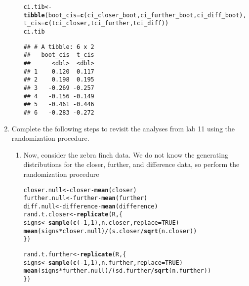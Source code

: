 \documentclass{article}\usepackage[]{graphicx}\usepackage[]{xcolor}
\makeatletter
\newcommand{\hlnum}[1]{\textcolor[rgb]{0.686,0.059,0.569}{#1}}%
\newcommand{\hlopt}[1]{\textcolor[rgb]{0,0,0}{#1}}%
\newcommand{\hldef}[1]{\textcolor[rgb]{0.345,0.345,0.345}{#1}}%
\newcommand{\hlkwb}[1]{\textcolor[rgb]{0.69,0.353,0.396}{#1}}%
\newcommand{\hlkwc}[1]{\textcolor[rgb]{0.333,0.667,0.333}{#1}}%
\newcommand{\hlkwd}[1]{\textcolor[rgb]{0.737,0.353,0.396}{\textbf{#1}}}%
\newenvironment{kframe}{%
 \def\at@end@of@kframe{}%
 \ifinner\ifhmode%
  \def\at@end@of@kframe{\end{minipage}}%
  \begin{minipage}{\columnwidth}%
 \fi\fi%
 \def\FrameCommand##1{\hskip\@totalleftmargin \hskip-\fboxsep
 \colorbox{shadecolor}{##1}\hskip-\fboxsep
     \hskip-\linewidth \hskip-\@totalleftmargin \hskip\columnwidth}%
 \MakeFramed {\advance\hsize-\width
   \@totalleftmargin\z@ \linewidth\hsize
   \@setminipage}}%
 {\par\unskip\endMakeFramed%
 \at@end@of@kframe}
\newenvironment{knitrout}{}{} %
\makeatother
\begin{document}
\begin{enumerate}
\begin{enumerate}
\begin{knitrout}
\begin{kframe}
\begin{alltt}
\hldef{ci.tib} \hlkwb{<-} \hlkwd{tibble}\hldef{(}\hlkwc{boot_cis} \hldef{=} \hlkwd{c}\hldef{(ci_closer_boot, ci_further_boot, ci_diff_boot),}
                 \hlkwc{t_cis} \hldef{=} \hlkwd{c}\hldef{(tci_closer, tci_further, tci_diff))}
\hldef{ci.tib}
\end{alltt}
\begin{verbatim}
## # A tibble: 6 x 2
##   boot_cis  t_cis
##      <dbl>  <dbl>
## 1    0.120  0.117
## 2    0.198  0.195
## 3   -0.269 -0.257
## 4   -0.156 -0.149
## 5   -0.461 -0.446
## 6   -0.283 -0.272
\end{verbatim}
\end{kframe}
\end{knitrout}
\end{enumerate}
\item Complete the following steps to revisit the analyses from lab 11 using the
randomization procedure.
\begin{enumerate}
\item Now, consider the zebra finch data. We do not know the generating distributions
for the closer, further, and difference data, so perform the randomization procedure
\begin{knitrout}\scriptsize
{}\color{fgcolor}\begin{kframe}
\begin{alltt}
\hldef{closer.null}  \hlkwb{<-} \hldef{closer}    \hlopt{-} \hlkwd{mean}\hldef{(closer)}
\hldef{further.null} \hlkwb{<-} \hldef{further}   \hlopt{-} \hlkwd{mean}\hldef{(further)}
\hldef{diff.null}    \hlkwb{<-} \hldef{difference} \hlopt{-} \hlkwd{mean}\hldef{(difference)}
\hldef{rand.t.closer} \hlkwb{<-} \hlkwd{replicate}\hldef{(R, \{}
  \hldef{signs} \hlkwb{<-} \hlkwd{sample}\hldef{(}\hlkwd{c}\hldef{(}\hlopt{-}\hlnum{1}\hldef{,}\hlnum{1}\hldef{), n.closer,} \hlkwc{replace} \hldef{=} \hlnum{TRUE}\hldef{)}
  \hlkwd{mean}\hldef{(signs} \hlopt{*} \hldef{closer.null)}  \hlopt{/} \hldef{(s.closer}   \hlopt{/} \hlkwd{sqrt}\hldef{(n.closer))}
\hldef{\})}

\hldef{rand.t.further} \hlkwb{<-} \hlkwd{replicate}\hldef{(R, \{}
  \hldef{signs} \hlkwb{<-} \hlkwd{sample}\hldef{(}\hlkwd{c}\hldef{(}\hlopt{-}\hlnum{1}\hldef{,}\hlnum{1}\hldef{), n.further,} \hlkwc{replace} \hldef{=} \hlnum{TRUE}\hldef{)}
  \hlkwd{mean}\hldef{(signs} \hlopt{*} \hldef{further.null)} \hlopt{/} \hldef{(sd.further} \hlopt{/} \hlkwd{sqrt}\hldef{(n.further))}
\hldef{\})}


\end{alltt}
\end{kframe}
\end{knitrout}
\end{enumerate}
\end{enumerate}
\end{document}
